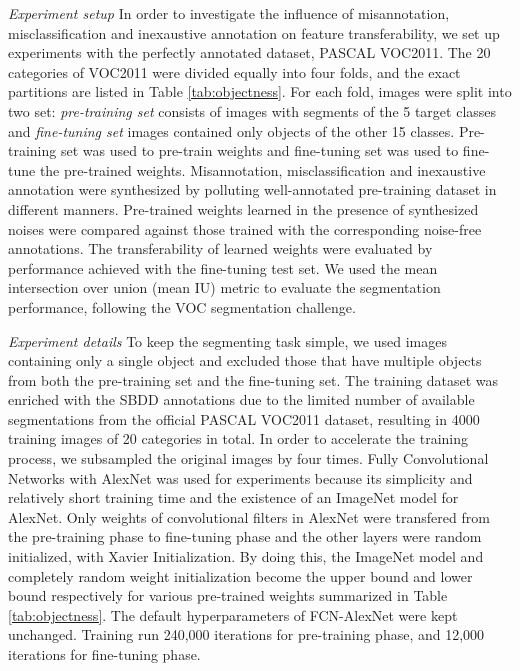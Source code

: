 \noindent
\textit{Experiment setup}
\noindent
In order to investigate the influence of misannotation, misclassification and inexaustive annotation on feature transferability, we set up experiments with the perfectly annotated dataset, PASCAL VOC2011\cite{everingham2015pascal}.
The 20 categories of VOC2011 were divided equally into four folds, and the exact partitions are listed in Table \ref{tab:objectness}.
For each fold, images were split into two set: \textit{pre-training set} consists of images with segments of the 5 target classes and \textit{fine-tuning set}  images contained only objects of the other 15 classes.
Pre-training set was used to pre-train weights and fine-tuning set was used to fine-tune the pre-trained weights.
Misannotation, misclassification and inexaustive annotation were synthesized by polluting well-annotated pre-training dataset in different manners.
Pre-trained weights learned in the presence of synthesized noises were compared against those trained with the corresponding noise-free annotations.
The transferability of learned weights were evaluated by performance achieved with the fine-tuning test set.
We used the mean intersection over union (mean IU) metric to evaluate the segmentation performance, following the VOC segmentation challenge.

\noindent \textit{Experiment details}
\noindent
To keep the segmenting task simple, we used images containing only a single object and excluded those that have multiple objects from both the pre-training set and the fine-tuning set.
The training dataset was enriched with the SBDD annotations due to the limited number of available segmentations from the official PASCAL VOC2011 dataset, resulting in 4000 training images of 20 categories in total.
In order to accelerate the training process, we subsampled the original images by four times.
Fully Convolutional Networks with AlexNet was used for experiments because its simplicity and relatively short training time and the existence of an ImageNet model for AlexNet.
Only weights of convolutional filters in AlexNet were transfered from the pre-training phase to fine-tuning phase and the other layers were random initialized, with Xavier Initialization.
By doing this, the ImageNet model and completely random weight initialization become the upper bound and lower bound respectively for various pre-trained weights summarized in Table \ref{tab:objectness}.
The default hyperparameters of FCN-AlexNet\cite{long2015fully} were kept unchanged.
Training run 240,000 iterations for pre-training phase, and 12,000 iterations for fine-tuning phase.


